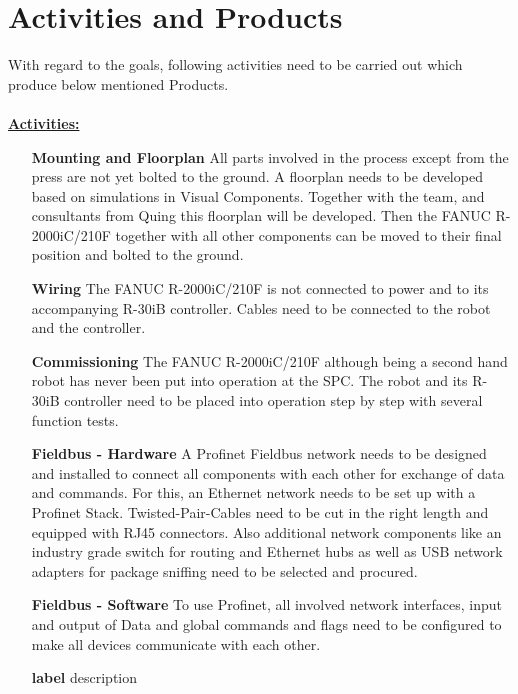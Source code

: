 
\chapter{Activities and Products}

With regard to the goals, following activities need to be carried out which produce below mentioned Products.\\
\\
\underline{\textbf{Activities:}}\vspace{2mm}
\begin{itemize}[leftmargin=5cm]
	\item[\textbf{Mounting and Floorplan}] All parts involved in the process except from the press are not yet bolted to the ground. A floorplan needs to be developed based on simulations in Visual Components. Together with the team, and consultants from Quing this floorplan will be developed. Then the FANUC R-2000iC/210F together with all other components can be moved to their final position and bolted to the ground.
	\item[\textbf{Wiring}] The FANUC R-2000iC/210F is not connected to power and to its accompanying R-30iB controller. Cables need to be connected to the robot and the controller.
	\item[\textbf{Commissioning}] The FANUC R-2000iC/210F although being a second hand robot has never been put into operation at the SPC. The robot and its R-30iB controller need to  be placed into operation step by step with several function tests.
	\item[\textbf{Fieldbus - Hardware}] A Profinet Fieldbus network needs to be designed and installed to connect all components with each other for exchange of data and commands. For this, an Ethernet network needs to be set up with a Profinet Stack. Twisted-Pair-Cables need to be cut in the right length and equipped with RJ45 connectors. Also additional network components like an industry grade switch for routing and Ethernet hubs as well as USB network adapters for package sniffing need  to be selected and procured. 
	\item[\textbf{Fieldbus - Software}] To use Profinet, all involved network interfaces, input and output of Data and global commands and flags need to be configured to make all devices communicate with each other.   
	\item[\textbf{label}] description
\end{itemize}

